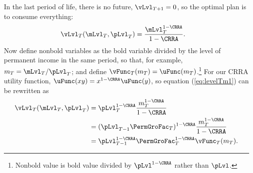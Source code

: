 \documentclass[titlepage, headings=optiontotocandhead]{\econtex}
\providecommand{\interval}{period}\renewcommand{\interval}{period}
\providecommand{\interval}{period}\renewcommand{\interval}{period}
\begin{document}
In the last {\interval} of life, there is no
future, ${\vLvl}
_{T+1} = 0$, so
the optimal plan is to consume everything:
\begin{equation}\begin{gathered}\begin{aligned}
      {\vLvl}
_{T}(\mLvl_{T},\pLvl_{T})  & = \frac{\mLvl_{T}^{1-\CRRA}}{1-\CRRA}. \label{eq:levelTm1}
    \end{aligned}\end{gathered}\end{equation}
Now define nonbold variables as the bold variable divided by
the level of permanent income in the same period, so that, for
example, ${m}_{T}=\mLvl_{T}/\pLvl_{T}$; and define
$\vFunc_{T}({m}_{T}) = \uFunc({m}_{T})$.\footnote{Nonbold value is bold value divided by $\pLvl^{1-\CRRA}$ rather than $\pLvl$.}  For our CRRA utility function, $\uFunc(xy)=x^{1-\CRRA}\uFunc(y)$, so equation (\ref{eq:levelTm1}) can be
rewritten as
\begin{equation*}\begin{gathered}\begin{aligned}
      {\vLvl}
      _{T}(\mLvl_{T},\pLvl_{T})  & = \pLvl_{T}^{1-\CRRA}\frac{{m}_{T}^{1-\CRRA}}{1-\CRRA}
      \\ &      = (\pLvl_{T-1}\PermGroFac_{T})^{1-\CRRA}\frac{{m}_{T}^{1-\CRRA}}{1-\CRRA}
      \\ &= \pLvl_{T-1}^{1-\CRRA}\PermGroFac_{T}^{1-\CRRA}\vFunc_{T}({m}_{T}).
    \end{aligned}\end{gathered}\end{equation*}
\end{document}

